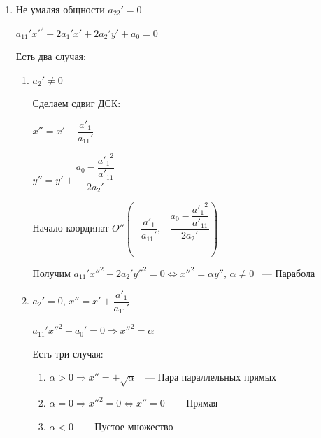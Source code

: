 \begin{enumerate}
\begin{enumerate}
              \item Не умаляя общности \(a_{22}' = 0\)

                    \(a_{11}' x'^2 + 2 a_1' x' + 2 a_2' y' + a_0 = 0\)

                    Есть два случая:
                    \begin{enumerate}
                        \item \(a_2' \neq 0\)

                              Сделаем сдвиг ДСК:

                              \(x'' = x' + \dfrac{a'_1}{a_{11}'}\)

                              \(y'' = y' + \dfrac{a_0 - \dfrac{{a'_1}^2}{a'_{11}}}{2 a_2'}\)

                              Начало координат \(O''\left(-\dfrac{a'_1}{a_{11}'}, -\dfrac{a_0 - \dfrac{{a'_1}^2}{a'_{11}}}{2 a_2'}\right)\)

                              Получим \(a_{11}' x''^2 + 2 a_2' y''^2 = 0 \Leftrightarrow x''^2 = \alpha y''\), \(\alpha \neq 0\) ~--- Парабола
                        \item \(a_2' = 0\), \(x'' = x' + \dfrac{a'_1}{a_{11}'}\)

                              \(a_{11}' x''^2 + a_0' = 0 \Rightarrow x''^2 = \alpha\)

                              Есть три случая:
                              \begin{enumerate}
                                  \item \(\alpha > 0 \Rightarrow x'' = \pm \sqrt \alpha\) ~--- Пара параллельных прямых

                                  \item \(\alpha = 0 \Rightarrow x''^2 = 0 \Leftrightarrow x'' = 0\) ~--- Прямая

                                  \item \(\alpha < 0\) ~--- Пустое множество
                              \end{enumerate}
                    \end{enumerate}
          \end{enumerate}
\end{enumerate}

